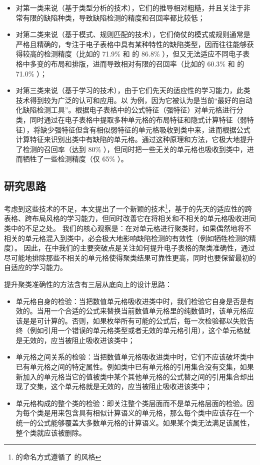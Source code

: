 \begin{itemize}
    \item 对第一类来说（基于类型分析的技术），它们的推导相对粗糙，并且关注于非常有限的缺陷种类，导致缺陷检测的精度和召回率都比较低\cite{zhang2017effectively}；
    \item 对第二类来说（基于模式、规则匹配的技术），它们倚仗的模式或规则通常是严格且精确的，专注于电子表格中具有某种特性的缺陷类型，因而往往能够获得较高的检测精度（比如\am 的 71.9\% 和 \ca 的 86.8\% \cite{dou2017cacheck}），但又无法适应不同电子表格中多变的布局和排版，进而导致相对有限的召回率（比如\am 的 60.3\% 和 \ca 的 71.0\% \cite{dou2017cacheck}）；
    \item 对第三类来说（基于学习的技术），由于它们先天的适应性的学习能力，此类技术得到较为广泛的认可和应用。以 \cu \cite{cheung2016custodes} 为例，因为它被认为是当前“最好的自动化缺陷检测工具”\cite{Barowy2018excelint}。\cu 根据电子表格中的公式特征（强特征）对单元格进行分类，同时通过在电子表格中提取多种单元格的布局特征和隐式计算特征（弱特征），将缺少强特征但含有相似弱特征的单元格吸收到类中来，进而根据公式计算特征来识别出类中有缺陷的单元格。通过这种原理和方法，它极大地提升了检测的召回率（达到 80\% \cite{cheung2016custodes}），但同时把一些无关的单元格也吸收到类中，进而牺牲了一些检测精度（仅 65\% \cite{cheung2016custodes}）。 
\end{itemize}


\subsection{研究思路}

考虑到这些技术的不足，本文提出了一个新颖的技术\wa \footnote{\wa 的命名方式遵循了 \cu 的风格}，基于\cu 的先天的适应性的跨表格、跨布局风格的学习能力，但同时改善它在将相关和不相关的单元格吸收进同类中的不足之处。
我们的核心观察是：在对单元格进行聚类时，如果偶然地将不相关的单元格混入到类中，必会极大地影响缺陷检测的有效性（例如牺牲检测的精度）。
因此，在\wa 中我们的主要突破点是关注如何提升电子表格的聚类准确性，通过尽可能地排除那些不相关的单元格使得聚类结果可靠性更高，同时也要保留\cu 最初的自适应的学习能力。

提升聚类准确性的方法含有三层从底向上的设计思路：
\begin{itemize}
    \item 单元格自身的检验：当把数值单元格吸收进类中时，我们检验它自身是否是有效的。当用一个合适的公式来替换当前数值单元格里的纯数值时，该单元格应该是是可计算的。否则，如果枚举所有可能的公式后，每一次检验都以失败告终（例如引用一个错误的单元格类型或者无效的单元格引用），这个单元格就是无效的，应当被阻止吸收进该类中；
    \item 单元格之间关系的检验：当把数值单元格吸收进类中时，它们不应该破坏类中已有单元格之间的特定属性。例如类中已有单元格的引用集合没有交集，如果新加入的单元格当它的值被类中某个其他单元格的公式替之间的引用集合却出现了交集，这个单元格就是无效的，应当被阻止吸收进该类中；
    \item 单元格构成的整个类的检验：即关注整个类层面而不是单元格层面的检验。因为每个类是用来包含具有相似计算语义的单元格，那么每个类中应该存在一个统一的公式能够覆盖大多数单元格的计算语义。如果某个类无法满足该属性，整个类就应该被删除。
\end{itemize}


